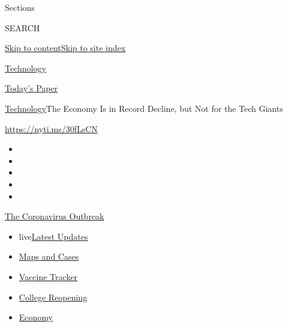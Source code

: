 Sections

SEARCH

\protect\hyperlink{site-content}{Skip to
content}\protect\hyperlink{site-index}{Skip to site index}

\href{https://www.nytimes.com/section/technology}{Technology}

\href{https://myaccount.nytimes.com/auth/login?response_type=cookie\&client_id=vi}{}

\href{https://www.nytimes.com/section/todayspaper}{Today's Paper}

\href{/section/technology}{Technology}\textbar{}The Economy Is in Record
Decline, but Not for the Tech Giants

\url{https://nyti.ms/30fLsCN}

\begin{itemize}
\item
\item
\item
\item
\item
\end{itemize}

\href{https://www.nytimes.com/news-event/coronavirus?action=click\&pgtype=Article\&state=default\&region=TOP_BANNER\&context=storylines_menu}{The
Coronavirus Outbreak}

\begin{itemize}
\tightlist
\item
  live\href{https://www.nytimes.com/2020/08/03/world/coronavirus-covid-19.html?action=click\&pgtype=Article\&state=default\&region=TOP_BANNER\&context=storylines_menu}{Latest
  Updates}
\item
  \href{https://www.nytimes.com/interactive/2020/us/coronavirus-us-cases.html?action=click\&pgtype=Article\&state=default\&region=TOP_BANNER\&context=storylines_menu}{Maps
  and Cases}
\item
  \href{https://www.nytimes.com/interactive/2020/science/coronavirus-vaccine-tracker.html?action=click\&pgtype=Article\&state=default\&region=TOP_BANNER\&context=storylines_menu}{Vaccine
  Tracker}
\item
  \href{https://www.nytimes.com/2020/08/02/us/covid-college-reopening.html?action=click\&pgtype=Article\&state=default\&region=TOP_BANNER\&context=storylines_menu}{College
  Reopening}
\item
  \href{https://www.nytimes.com/live/2020/08/03/business/stock-market-today-coronavirus?action=click\&pgtype=Article\&state=default\&region=TOP_BANNER\&context=storylines_menu}{Economy}
\end{itemize}

